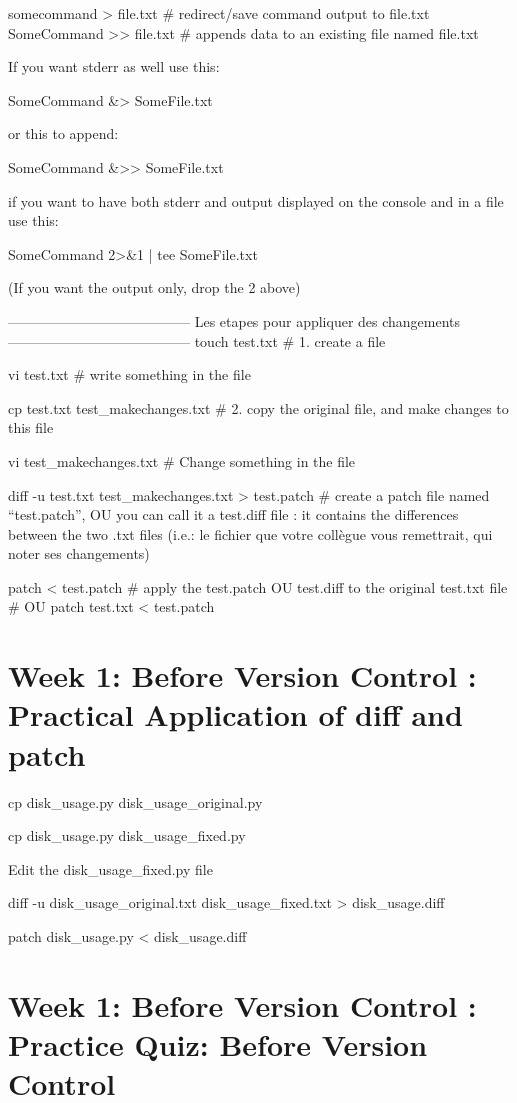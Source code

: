 \documentclass[11pt, onecolumn]{article}
\begin{document}
somecommand > file.txt    # redirect/save command output to file.txt
SomeCommand >> file.txt  # appends data to an existing file named file.txt

If you want stderr as well use this:

SomeCommand &> SomeFile.txt  

or this to append:

SomeCommand &>> SomeFile.txt  

if you want to have both stderr and output displayed on the console and in a file use this:

SomeCommand 2>&1 | tee SomeFile.txt

(If you want the output only, drop the 2 above)


---------------------------------------
Les etapes pour appliquer des changements
---------------------------------------
touch test.txt # 1. create a file

vi test.txt  # write something in the file

cp test.txt test_makechanges.txt   # 2. copy the original file, and make changes to this file

vi test_makechanges.txt   # Change something in the file

diff -u test.txt test_makechanges.txt > test.patch # create a patch file named “test.patch”, OU you can call it a test.diff file : it contains the differences between the two .txt files (i.e.: le fichier que votre collègue vous remettrait, qui noter ses changements)

patch < test.patch   # apply the test.patch OU test.diff to the original test.txt file 
# OU
patch test.txt < test.patch 


\section{Week 1: Before Version Control : Practical Application of diff and patch}

cp disk_usage.py disk_usage_original.py

cp disk_usage.py disk_usage_fixed.py

Edit the disk_usage_fixed.py file

diff -u disk_usage_original.txt disk_usage_fixed.txt > disk_usage.diff

patch disk_usage.py < disk_usage.diff


\section{Week 1: Before Version Control : Practice Quiz: Before Version Control}
\end{document}
